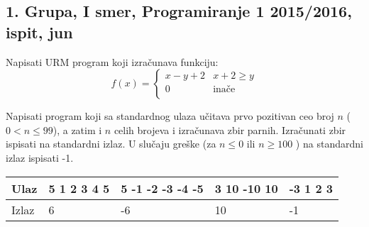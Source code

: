 \subsection{1. Grupa, I smer, Programiranje 1 2015/2016, ispit, jun}

\begin{Exercise}[label=v1.3_01] 
Napisati URM program koji izra\v cunava funkciju:
    $$ f(x)= \begin{cases}
                  x - y + 2  & x + 2 \geq y \\
                  0 & \text{ina\v ce} \\
                  \end{cases}  $$
\end{Exercise}
\begin{Answer}[ref=v1.3_01]
\end{Answer}


\begin{Exercise}[label=v1.3_01] 
Napisati program koji sa standardnog ulaza u\v citava prvo pozitivan
  ceo broj $n$ ( $0 < n \le 99$), a zatim i $n$ celih brojeva i izra\v
  cunava zbir parnih. Izra\v cunati zbir ispisati na standardni
  izlaz. U slu\v caju gre\v ske (za $n \leq 0$ ili $n \ge 100 $ ) na
  standardni izlaz ispisati -1.


\small
\begin{tabular}{ |l|l|l|l|l| }
\hline 
  Ulaz & 5 1 2 3 4 5  & 5 -1 -2 -3 -4 -5 & 3 10 -10 10 & -3 1 2 3 \\ \hline 
  Izlaz & 6 & -6 & 10 & -1 \\ \hline 
\end{tabular}
\normalsize
{}
\end{Exercise}
\begin{Answer}[ref=v1.3_01]
\end{Answer}

